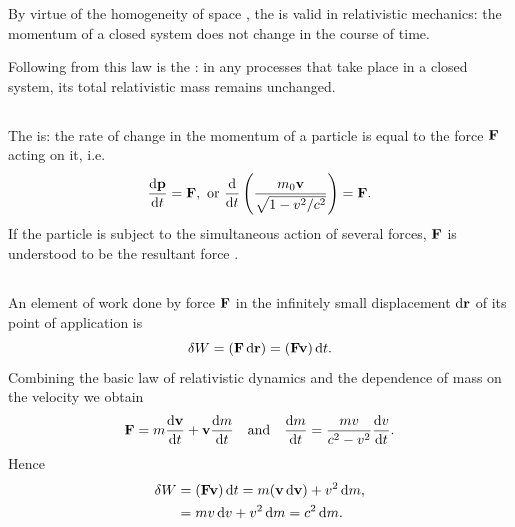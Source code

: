 By virtue of the homogeneity of space , the  is valid in relativistic mechan­ics: the momentum of a closed system  does not change in the course of time.

Following from this law is the : in any processes that take place in a closed system, its total relativistic mass remains unchanged.

\subsection{}\label{5.6.3} The  is: the rate of change in the momentum of a particle is equal to the force $\vb{F}$ acting on it, i.e.
\begin{equation*}%
\dv{\vb{p}}{t} = \vb{F},\,\,\textrm{or}\,\,\dv{t} \left( \frac{m_{0}\vb{v}}{\sqrt{1 - v^{2}/c^{2}}}\right) = \vb{F}.
\end{equation*}
 If the particle is subject to the simultaneous action of several forces, $\vb{F}$ is understood to be the resultant force . 

\subsection{}\label{5.6.4} An element of work done by force $\vb{F}$ in the infinitely small displacement $\dd \vb{r}$ of its point of application is
\begin{equation*}%
\delta W = (\vb{F}\, \dd \vb{r})= (\vb{Fv})\, \dd t.
\end{equation*}
Combining the basic law of relativistic dynamics  and the dependence of mass on the velocity  we obtain
\begin{equation*}%
\vb{F} = m \dv{\vb{v}}{t} + \vb{v} \dv{m}{t} \qand \dv{m}{t} =\frac{mv}{c^{2}-v^{2}}\dv{v}{t}.
\end{equation*}
Hence
\begin{align*}%
\delta W &= (\vb{Fv})\, \dd t = m(\vb{v} \,\dd \vb{v})+ v^{2}\,\dd m, \\
& = mv \,\dd v  +v^{2} \,\dd m = c^{2} \,\dd m.
\end{align*}
 
